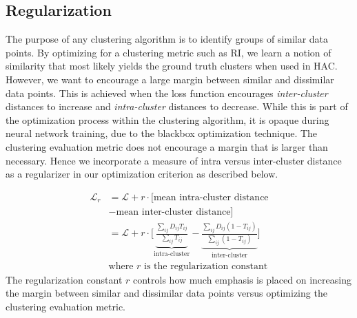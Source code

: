 \documentclass[11pt,a4paper]{article}
\begin{document}
\subsection{Regularization}\label{sec:reg} The purpose of any clustering algorithm is to identify groups of similar data points. By optimizing for a clustering metric such as RI, we learn a notion of similarity that most likely yields the ground truth clusters when used in HAC. However, we want to encourage a large margin between similar and dissimilar data points.
This is achieved when the loss function encourages \textit{inter-cluster} distances to increase and \textit{intra-cluster} distances to decrease. 
While this is part of the optimization process within the clustering algorithm, it is opaque during neural network training, due to the blackbox optimization technique. The clustering evaluation metric does not encourage a margin that is larger than necessary. 
Hence we incorporate a measure of intra versus inter-cluster distance as a regularizer in our optimization criterion as described below.

\begin{align*}
    \mathcal{L}_{r} &= \mathcal{L} + r \cdot [\textrm{mean intra-cluster distance}\\ &- \textrm{mean inter-cluster distance}] \\
    &= \mathcal{L} + r \cdot \Bigg[\underbrace{\frac{\sum_{ij} D_{ij}T_{ij}}{\sum_{ij} T_{ij}}}_{\text{intra-cluster}} - \underbrace{\frac{\sum_{ij} D_{ij}(1-T_{ij})}{\sum_{ij}(1-T_{ij})}}_{\text{inter-cluster}}\Bigg] \\
    &\textrm{where $r$ is the regularization constant}
\end{align*}
The regularization constant $r$ controls how much emphasis is placed on increasing the margin between similar and dissimilar data points versus optimizing the clustering evaluation metric.
\end{document}
